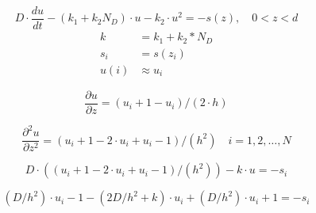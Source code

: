 \begin{equation}
	D\cdot \frac{du}{dt} -\left( k_1 +k_2 N_D\right)\cdot u-k_2\cdot u^2=-s(z), \quad 0 <z<d
\end{equation}\label{eq:stationDGL}
\begin{align*}
	k&=k_1+k_2*N_D\\
	s_i&=s(z_i)\\
	u(i)&\approx u_i
\end{align*}


\begin{equation}
	\frac{\partial u}{\partial z} = (u_i+1 - u_i)/(2\cdot h)
\end{equation}

\begin{equation}
	\frac{\partial ^2 u }{\partial z^2} = (u_i+1 - 2\cdot u_i + u_i-1)/(h^2) \quad i=1,2,\dots,N
\end{equation}

\begin{equation}
	D\cdot ((u_i+1 - 2\cdot u_i + u_i-1)/(h^2)) -k\cdot u = -s_i
\end{equation}

\begin{equation}
	(D/h^2)\cdot u_i-1 - (2D/h^2+k)\cdot u_i + (D/h^2)\cdot u_i+1 = -s_i
\end{equation}

